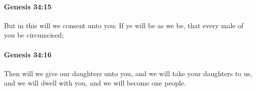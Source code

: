 		\paragraph{Genesis 34:15} %
			\label{GENESIS-34-15}

			But in this will we consent unto you: If ye will be as we be, that every male of you be circumcised;


		\paragraph{Genesis 34:16} %
			\label{GENESIS-34-16}

			Then will we give our daughters unto you, and we will take your daughters to us, and we will dwell with you, and we will become one people.


